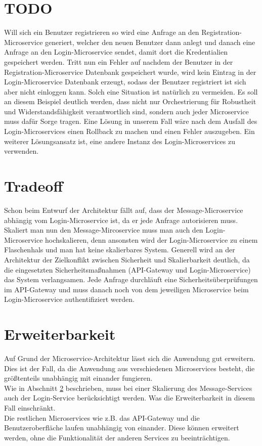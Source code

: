 \section{TODO}
 Will sich ein Benutzer registrieren so wird eine Anfrage an den Registration-Microservice generiert, welcher den neuen Benutzer dann anlegt und danach eine Anfrage an den Login-Microservice sendet, damit dort die Kredentialien gespeichert werden. Tritt nun ein Fehler auf nachdem der Benutzer in der Registration-Microservice Datenbank gespeichert wurde, wird kein Eintrag in der Login-Microservice Datenbank erzeugt, sodass der Benutzer registriert ist sich aber nicht einloggen kann. Solch eine Situation ist natürlich zu vermeiden. Es soll an diesem Beispiel deutlich werden, dass nicht nur Orchestrierung für Robustheit und Widerstandsfähigkeit verantwortlich sind, sondern auch jeder Microservice muss dafür Sorge tragen. Eine Lösung in unserem Fall wäre nach dem Ausfall des Login-Microservices einen Rollback zu machen und einen Fehler auszugeben. Ein weiterer Lösungsansatz ist, eine andere Instanz des Login-Microservices zu verwenden.
 
\section{Tradeoff}
\label{tradeoff}
Schon beim Entwurf der Architektur fällt auf, dass der Message-Microservice abhängig vom Login-Microservice ist, da er jede Anfrage autorisieren muss. Skaliert man nun den Message-Mircoservice muss man auch den Login-Microservice hochskalieren, denn ansonsten wird der Login-Microservice zu einem Flaschenhals und man hat keine skalierbares System. Generell wird an der Architektur der Zielkonflikt zwischen Sicherheit und Skalierbarkeit deutlich, da die eingesetzten Sicherheitsmaßnahmen (API-Gateway und Login-Microservice) das System verlangsamen. Jede Anfrage durchläuft eine Sicherheitsüberprüfungen im API-Gateway und muss danach noch von dem jeweiligen Microservice beim Login-Microservice authentifiziert werden.


\section{Erweiterbarkeit}
Auf Grund der Microservice-Architektur lässt sich die Anwendung gut erweitern. Dies ist der Fall, da die Anwendung aus verschiedenen Microservices besteht, die größtenteils unabhängig mit einander fungieren.\\
Wie in Abschnitt \ref{tradeoff} beschrieben, muss bei einer Skalierung des Message-Services auch der Login-Service berücksichtigt werden. Was die Erweiterbarkeit in diesem Fall einschränkt.\\
Die restlichen Microservices wie z.B. das API-Gateway und die Benutzeroberfläche laufen unabhängig von einander. Diese können erweitert werden, ohne die Funktionalität der anderen Services zu beeinträchtigen.